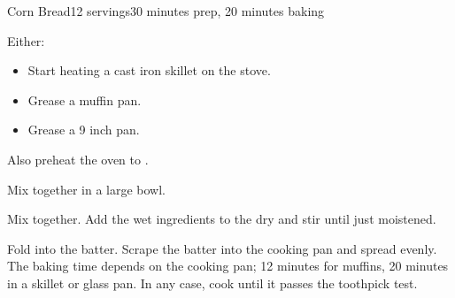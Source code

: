 \documentclass[../Cookbook.tex]{subfiles}
\begin{document}
\begin{recipe}{Corn Bread}{12 servings}{30 minutes prep, 20 minutes baking}

  Either:
  \begin{itemize}
    \item Start heating a cast iron skillet on the stove.
    \item Grease a muffin pan.
    \item Grease a 9 inch pan.
  \end{itemize}
  Also preheat the oven to .

  Mix together in a large bowl.

  Mix together.
  Add the wet ingredients to the dry and stir until just moistened.

  Fold into the batter.
  Scrape the batter into the cooking pan and spread evenly.
  The baking time depends on the cooking pan; 12 minutes for muffins, 20 minutes in a skillet or glass pan.
  In any case, cook until it passes the toothpick test.

\end{recipe}
\end{document}

